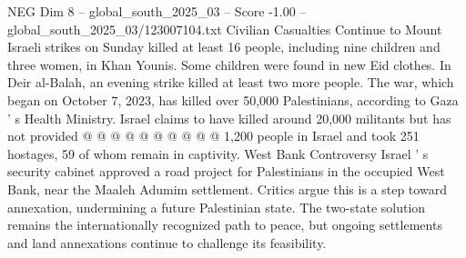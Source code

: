 \begin{textsample}{NEG Dim 8 – global\_south\_2025\_03 – Score -1.00 – global\_south\_2025\_03/123007104.txt}
Civilian Casualties Continue to Mount Israeli strikes on Sunday killed at least 16 people, including nine children and three women, in Khan Younis.
Some children were found in new Eid clothes.
In Deir al-Balah, an evening strike killed at least two more people.
The war, which began on October 7, 2023, has killed over 50,000 Palestinians, according to Gaza ' s Health Ministry.
Israel claims to have killed around 20,000 militants but has not provided @ @ @ @ @ @ @ @ @ @ 1,200 people in Israel and took 251 hostages, 59 of whom remain in captivity.
West Bank Controversy Israel ' s security cabinet approved a road project for Palestinians in the occupied West Bank, near the Maaleh Adumim settlement.
Critics argue this is a step toward annexation, undermining a future Palestinian state.
The two-state solution remains the internationally recognized path to peace, but ongoing settlements and land annexations continue to challenge its feasibility.

\end{textsample}
